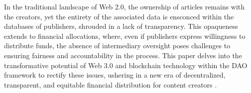 \documentclass[lettersize,journal]{IEEEtran}
\begin{document}
In the traditional landscape of Web 2.0, the ownership of articles remains with the creators, yet the entirety of the associated data is ensconced within the databases of publishers, shrouded in a lack of transparency. This opaqueness extends to financial allocations, where, even if publishers express willingness to distribute funds, the absence of intermediary oversight poses challenges to ensuring fairness and accountability in the process. This paper delves into the transformative potential of Web 3.0 and blockchain technology within the DAO framework to rectify these issues, ushering in a new era of decentralized, transparent, and equitable financial distribution for content creators \cite{nath2014web}.
  
\end{document}
